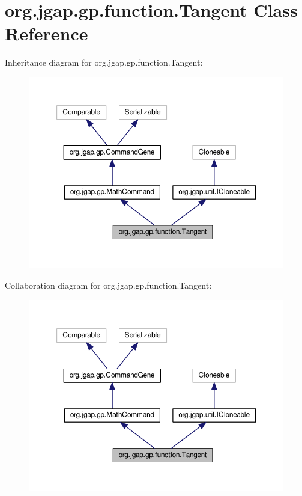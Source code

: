 \hypertarget{classorg_1_1jgap_1_1gp_1_1function_1_1_tangent}{\section{org.\-jgap.\-gp.\-function.\-Tangent Class Reference}
\label{classorg_1_1jgap_1_1gp_1_1function_1_1_tangent}
}


Inheritance diagram for org.\-jgap.\-gp.\-function.\-Tangent\-:
\nopagebreak
\begin{figure}[H]
\begin{center}
\leavevmode
\includegraphics[width=350pt]{classorg_1_1jgap_1_1gp_1_1function_1_1_tangent__inherit__graph}
\end{center}
\end{figure}


Collaboration diagram for org.\-jgap.\-gp.\-function.\-Tangent\-:
\nopagebreak
\begin{figure}[H]
\begin{center}
\leavevmode
\includegraphics[width=350pt]{classorg_1_1jgap_1_1gp_1_1function_1_1_tangent__coll__graph}
\end{center}
\end{figure}
